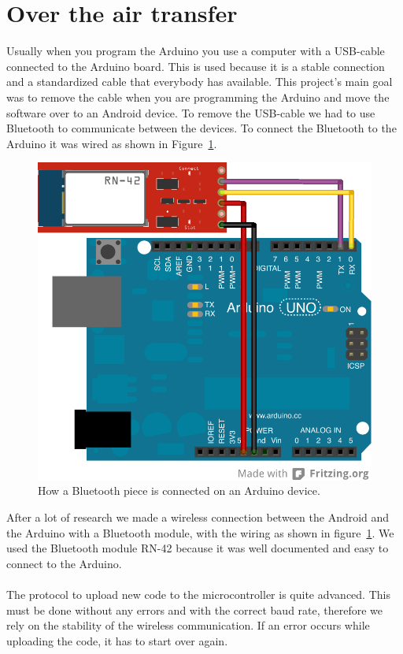 \section{Over the air transfer}
\label{sec:SimpleArduinoWiring}
Usually when you program the Arduino you use a computer with a USB-cable connected to the Arduino board. This is used because it is a stable connection and a standardized cable that everybody has available. This project's main goal was to remove the cable when you are programming the Arduino and move the software over to an Android device. To remove the USB-cable we had to use Bluetooth to communicate between the devices. To connect the Bluetooth to the Arduino it was wired as shown in Figure~\ref{fig:SimpleArduinoWiring}.
\\
\begin{figure}[H]
\centering
\includegraphics[scale=1.2]{images/wiring_simple.png}
\caption[Wiring Diagram for BT module]{How a Bluetooth piece is connected on an Arduino device.}
\label{fig:SimpleArduinoWiring}
\end{figure}

After a lot of research we made a wireless connection between the Android and the Arduino with a Bluetooth module, with the wiring as shown in figure~\ref{fig:SimpleArduinoWiring}. We used the Bluetooth module RN-42 \cite{rn-42} because it was well documented and easy to connect to the Arduino.\\
\\
The protocol to upload new code to the microcontroller is quite advanced. This must be done without any errors and with the correct baud rate, therefore we rely on the stability of the wireless communication. If an error occurs while uploading the code, it has to start over again.
